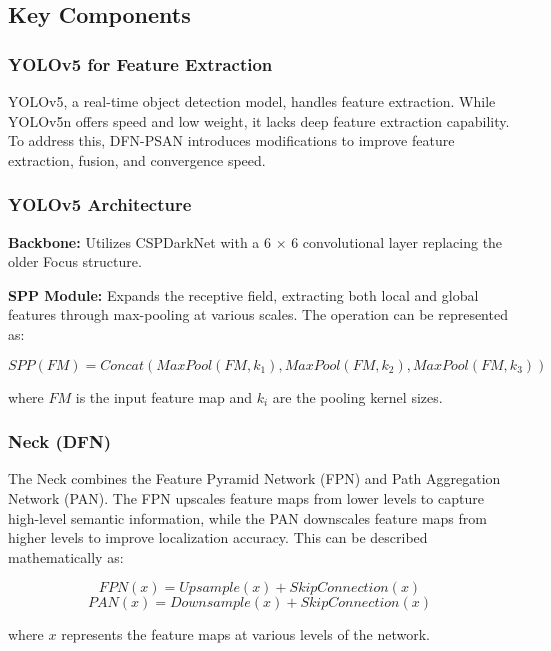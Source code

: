 \documentclass[12pt,a4paper]{article}
\begin{document}
\subsection{Key Components}
\subsubsection{YOLOv5 for Feature Extraction}
YOLOv5, a real-time object detection model, handles feature extraction. While YOLOv5n offers speed and low weight, it lacks deep feature extraction capability. To address this, DFN-PSAN introduces modifications to improve feature extraction, fusion, and convergence speed.

\subsubsection{YOLOv5 Architecture}
\textbf{Backbone:} Utilizes CSPDarkNet with a 6 × 6 convolutional layer replacing the older Focus structure.

\textbf{SPP Module:} Expands the receptive field, extracting both local and global features through max-pooling at various scales. The operation can be represented as:

\begin{equation}
SPP(FM) = Concat(MaxPool(FM,k_1), MaxPool(FM,k_2), MaxPool(FM,k_3))
\end{equation}

where $FM$ is the input feature map and $k_i$ are the pooling kernel sizes.

\subsubsection{Neck (DFN)}
The Neck combines the Feature Pyramid Network (FPN) and Path Aggregation Network (PAN). The FPN upscales feature maps from lower levels to capture high-level semantic information, while the PAN downscales feature maps from higher levels to improve localization accuracy. This can be described mathematically as:

\begin{equation}
FPN(x) = Upsample(x) + SkipConnection(x)
\end{equation}
\begin{equation}
PAN(x) = Downsample(x) + SkipConnection(x)
\end{equation}

where $x$ represents the feature maps at various levels of the network.
\end{document}
